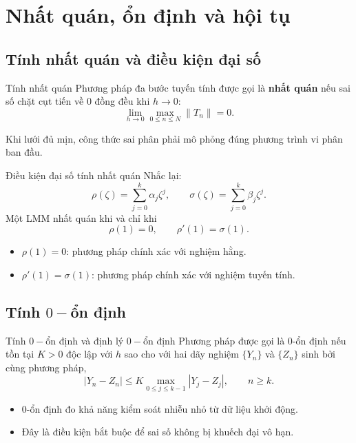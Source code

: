 \documentclass[aspectratio=43]{beamer}
\newcommand{\norm}[1]{\left\lVert #1 \right\rVert}
\begin{document}
\section{Nhất quán, ổn định và hội tụ}
\subsection*{Tính nhất quán và điều kiện đại số}
\begin{frame}
\begin{baitapbox}{Tính nhất quán}
Phương pháp đa bước tuyến tính được gọi là \textbf{nhất quán} nếu sai số chặt cụt tiến về $0$ đồng đều khi $h\to0$:
\[
 \lim_{h\to0}\max_{0\le n\le N}\norm{T_n}=0.
\]
\end{baitapbox}
\begin{tcolorbox}[title={Ý nghĩa}, colback=softgreen, colframe=tealgreen, colbacktitle=tealgreen]
Khi lưới đủ mịn, công thức sai phân phải mô phỏng đúng phương trình vi phân ban đầu.
\end{tcolorbox}
\end{frame}

\begin{frame}
\begin{baitapbox}{Điều kiện đại số tính nhất quán}
Nhắc lại:
\[
 \rho(\zeta)=\sum_{j=0}^{k}\alpha_j\zeta^j,
 \qquad
 \sigma(\zeta)=\sum_{j=0}^{k}\beta_j\zeta^j.
\]
Một LMM nhất quán khi và chỉ khi
\[
 \rho(1)=0,
 \qquad
 \rho'(1)=\sigma(1).
\]
\end{baitapbox}
\begin{itemize}
  \item $\rho(1)=0$: phương pháp chính xác với nghiệm hằng.
  \item $\rho'(1)=\sigma(1)$: phương pháp chính xác với nghiệm tuyến tính.
\end{itemize}
\end{frame}

\subsection*{Tính $0-$ổn định}

\begin{frame}
\begin{baitapbox}{Tính $0-$ổn định và định lý $0-$ổn định}
Phương pháp được gọi là 0-ổn định nếu tồn tại $K>0$ độc lập với $h$ sao cho với hai dãy nghiệm $\{Y_n\}$ và $\{Z_n\}$ sinh bởi cùng phương pháp,
\[
 |Y_n-Z_n|\le K\max_{0\le j\le k-1}|Y_j-Z_j|,
 \qquad n\ge k.
\]
\end{baitapbox}
\begin{itemize}
  \item 0-ổn định đo khả năng kiểm soát nhiễu nhỏ từ dữ liệu khởi động.
  \item Đây là điều kiện bắt buộc để sai số không bị khuếch đại vô hạn.
\end{itemize}
\end{frame}
\end{document}
